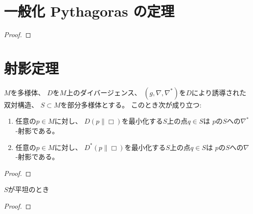\documentclass[report]{jlreq}
\begin{document}
%
\section{一般化 Pythagoras の定理}

\begin{theorem}
    \TODO{}
\end{theorem}

\begin{proof}
    \TODO{}
\end{proof}

%
\section{射影定理}

\begin{definition}[測地射影]
    \TODO{}
\end{definition}

\begin{theorem}[射影定理]
    $M$を多様体、
    $D$を$M$上のダイバージェンス、
    $(g, \nabla, \nabla^*)$を$D$により誘導された双対構造、
    $S \subset M$を部分多様体とする。
    このとき次が成り立つ:
    \begin{enumerate}
        \item 任意の$p \in M$に対し、
            $D(p \| \Box)$を最小化する$S$上の点$q \in S$は
            $p$の$S$への$\nabla^*$-射影である。
        \item 任意の$p \in M$に対し、
            $D^*(p \| \Box)$を最小化する$S$上の点$q \in S$は
            $p$の$S$への$\nabla$-射影である。
    \end{enumerate}
\end{theorem}

\begin{proof}
    \TODO{}
\end{proof}

\begin{theorem}[一意性]
    $S$が平坦のとき
    \TODO{}
\end{theorem}

\begin{proof}
    \TODO{}
\end{proof}
\end{document}
